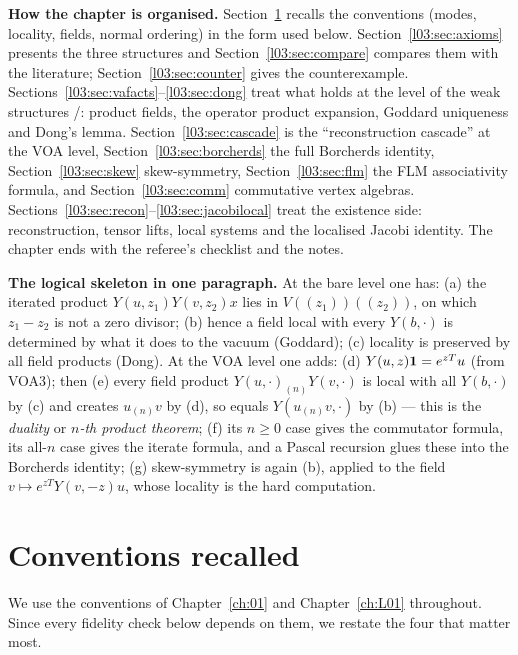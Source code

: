 \textbf{How the chapter is organised.} Section~\ref{l03:sec:conventions} recalls the conventions
(modes, locality, fields, normal ordering) in the form used below. Section~\ref{l03:sec:axioms}
presents the three structures and Section~\ref{l03:sec:compare} compares them with the literature;
Section~\ref{l03:sec:counter} gives the counterexample. Sections~\ref{l03:sec:vafacts}--\ref{l03:sec:dong}
treat what holds at the level of the weak structures /: product fields, the operator product
expansion, Goddard uniqueness and Dong's lemma. Section~\ref{l03:sec:cascade} is the
``reconstruction cascade'' at the VOA level, Section~\ref{l03:sec:borcherds} the full Borcherds
identity, Section~\ref{l03:sec:skew} skew-symmetry, Section~\ref{l03:sec:flm} the FLM associativity
formula, and Section~\ref{l03:sec:comm} commutative vertex algebras.
Sections~\ref{l03:sec:recon}--\ref{l03:sec:jacobilocal} treat the existence side: reconstruction,
tensor lifts, local systems and the localised Jacobi identity. The chapter ends with the referee's
checklist and the notes.

\textbf{The logical skeleton in one paragraph.} At the bare level one has: (a) the iterated
product $Y(u,z_1)Y(v,z_2)x$ lies in $V((z_1))((z_2))$, on which $z_1-z_2$ is not a zero divisor;
(b) hence a field local with every $Y(b,\cdot)$ is determined by what it does to the vacuum
(Goddard); (c) locality is preserved by all field products (Dong). At the VOA level one adds:
(d) $Y(u,z)\mathbf{1} = e^{zT}u$ (from VOA3); then (e) every field product $Y(u,\cdot)_{(n)}Y(v,\cdot)$
is local with all $Y(b,\cdot)$ by (c) and creates $u_{(n)}v$ by (d), so equals $Y(u_{(n)}v,\cdot)$
by (b) --- this is the \emph{duality} or \emph{$n$-th product theorem}; (f) its $n\ge0$ case gives
the commutator formula, its all-$n$ case gives the iterate formula, and a Pascal recursion glues
these into the Borcherds identity; (g) skew-symmetry is again (b), applied to the field
$v\mapsto e^{zT}Y(v,-z)u$, whose locality is the hard computation.

\section{Conventions recalled}\label{l03:sec:conventions}

We use the conventions of Chapter~\ref{ch:01} and Chapter~\ref{ch:L01} throughout. Since every
fidelity check below depends on them, we restate the four that matter most.

